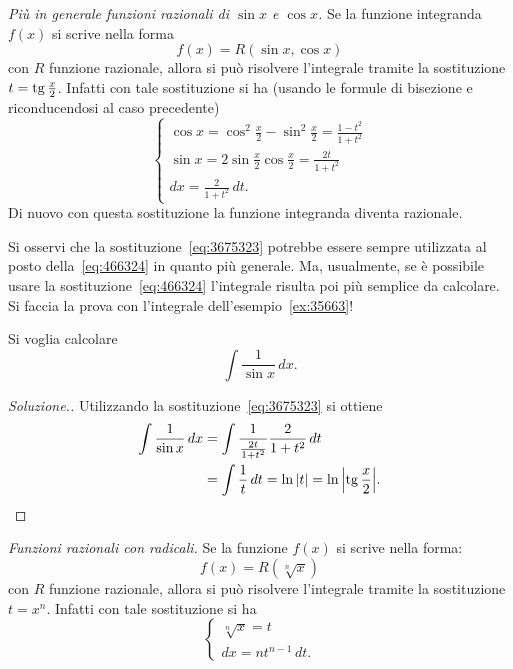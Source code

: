 \emph{Più in generale funzioni razionali di $\sin x$ e $\cos x$.}
Se la funzione integranda $f(x)$ si scrive nella forma
\[
  f(x) = R(\sin x, \cos x)
\]
con $R$ funzione razionale, allora si può risolvere l'integrale
tramite la sostituzione $t=\operatorname{tg} \frac{x}{2}$. Infatti con tale sostituzione si ha
(usando le formule di bisezione e riconducendosi al caso precedente)
\begin{equation}\label{eq:3675323}
  \begin{cases}
    \cos x = \cos^2 \frac x 2 - \sin^2 \frac x 2 = \frac{1-t^2}{1+t^2} \\
    \sin x = 2 \sin \frac x 2 \cos \frac x 2 = \frac{2t}{1+t^2}\\
    dx = \frac{2}{1+t^2}\, dt.
  \end{cases}
\end{equation}
Di nuovo con questa sostituzione la funzione integranda diventa razionale.

\begin{remark}
Si osservi che la sostituzione~\eqref{eq:3675323} potrebbe essere
sempre utilizzata al posto della~\eqref{eq:466324} in quanto più generale.
Ma, usualmente, se è possibile usare la sostituzione~\eqref{eq:466324}
l'integrale risulta
poi più semplice da calcolare. Si faccia la prova con l'integrale
dell'esempio~\ref{ex:35663}!
\end{remark}

\begin{example}
Si voglia calcolare
\[
 \int \frac{1}{\sin x}\, dx.
\]
\end{example}
\begin{proof}[Soluzione.]
Utilizzando la sostituzione~\eqref{eq:3675323}
si ottiene
\begin{align*}
  \int \frac{1}{\sin x}\, dx
  &= \int \frac{1}{\frac{2t}{1+t^2}}\frac{2}{1+t^2}\, dt \\
  &= \int \frac{1}{t}\, dt = \ln{\left|t\right|} = \ln {\left|\operatorname{tg}\frac x 2\right|}.
\end{align*}
\end{proof}

\emph{Funzioni razionali con radicali.}
Se la funzione $f(x)$ si scrive nella forma:
\[
  f(x) = R(\sqrt[n] x)
\]
con $R$ funzione razionale, allora si può risolvere l'integrale tramite
la sostituzione $t = x^n$. Infatti con tale sostituzione si ha
\begin{equation}\label{eq:4675821}
\begin{cases}
  \sqrt[n] x = t\\
  dx = n t^{n-1}\, dt.
\end{cases}
\end{equation}

